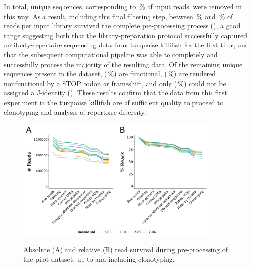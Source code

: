 In total,  unique sequences, corresponding to \,\% of input reads, were removed in this way. As a result, including this final filtering step, between \,\% and \,\% of reads per input library survived the complete pre-processing process (), a good range suggesting both that the library-preparation protocol successfully captured antibody-repertoire sequencing data from turquoise killifish for the first time, and that the subsequent computational pipeline was able to completely and successfully process the majority of the resulting data. Of the remaining  unique sequences present in the dataset,  (\,\%) are functional,  (\,\%) are rendered nonfunctional by a STOP codon or frameshift, and only  (\,\%) could not be assigned a J-identity (). These results confirm that the data from this first \igseq experiment in the turquoise killifish are of sufficient quality to proceed to clonotyping and analysis of repertoire diversity.

\begin{figure}
\centering
\includegraphics[width = 0.9\textwidth]{_Figures/png/pilot-read-survival-all.png}
\begin{subfigure}{0em}
\label{fig:igseq-pilot-read-survival-all-a}
\end{subfigure}
\begin{subfigure}{0em}
\label{fig:igseq-pilot-read-survival-all-b}
\end{subfigure}
\caption{Absolute (A) and relative (B) read survival during pre-processing of the pilot \igseq dataset, up to and including clonotyping.}
\label{fig:igseq-pilot-read-survival-all}
\end{figure}


